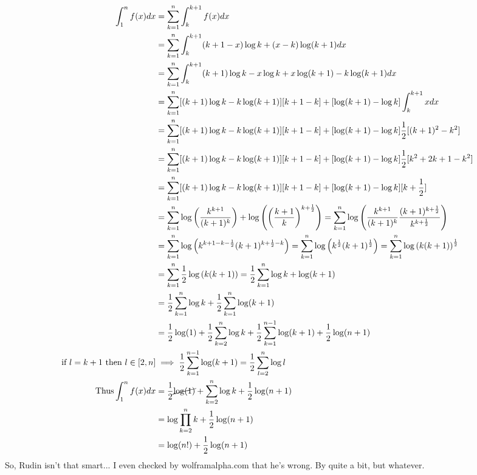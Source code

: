 \documentclass{article}
\begin{document}
\begin{align*}
  \int_{1}^n f(x) dx
  &=\sum_{k=1}^n \int_{k}^{k+1} f(x) dx\\
  &=\sum_{k=1}^n \int_{k}^{k+1} (k+1-x)\log k +(x-k)\log (k+1) dx\\
  &=\sum_{k=1}^n \int_{k}^{k+1} (k+1)\log k -x\log k +x\log
    (k+1)-k\log (k+1) dx\\
  &=\sum_{k=1}^n [(k+1)\log k -k\log (k+1)][k+1-k]  +[\log
    (k+1)-\log k]\int_{k}^{k+1} x dx\\
  &=\sum_{k=1}^n [(k+1)\log k -k\log (k+1)][k+1-k]  +[\log
    (k+1)-\log k]\frac{1}{2}[(k+1)^2 - k^2]\\
  &=\sum_{k=1}^n [(k+1)\log k -k\log (k+1)][k+1-k]  +[\log
    (k+1)-\log k]\frac{1}{2}[k^2+2k + 1 - k^2]\\
  &=\sum_{k=1}^n [(k+1)\log k -k\log (k+1)][k+1-k]  +[\log
    (k+1)-\log k][k + \frac{1}{2}]\\
  &=\sum_{k=1}^n \log \left(\frac{k^{k+1}}{(k+1)^k}\right) + \log\left(  \left(
    \frac{k+1}{k}\right)^{k + \frac{1}{2}}\right) =\sum_{k=1}^n \log \left(\frac{k^{k+1}}{(k+1)^k}
    \frac{(k+1)^{k + \frac{1}{2}}}{k^{k + \frac{1}{2}}}\right)\\
  &= \sum_{k=1}^n \log \left(  k^{k+1-k-\frac{1}{2}}(k+1)^{k +
    \frac{1}{2}-k}\right)
    = \sum_{k=1}^n \log \left(
    k^{\frac{1}{2}}(k+1)^{\frac{1}{2}}\right) = \sum_{k=1}^n \log \left(
    k(k+1)\right)^{\frac{1}{2}}\\
  &= \sum_{k=1}^n \frac{1}{2} \log \left(  k(k+1)\right) =
    \frac{1}{2}\sum_{k=1}^n  \log k + \log (k+1)\\
  &= \frac{1}{2}\sum_{k=1}^n  \log k + \frac{1}{2}\sum_{k=1}^n \log
    (k+1)\\
    &= \frac{1}{2}\log(1) + \frac{1}{2}\sum_{k=2}^n  \log k + \frac{1}{2}\sum_{k=1}^{n-1} \log
    (k+1) + \frac{1}{2}\log (n+1)\\
  \text{ if } l = k+1 \text{ then } l \in [2,n] &\implies \frac{1}{2}\sum_{k=1}^{n-1} \log
                        (k+1) = \frac{1}{2}\sum_{l=2}^n \log l\\
\text{Thus} \int_{1}^n f(x) dx
  &= \frac{1}{2}\cancel{ \log(1)}+ \sum_{k=2}^n  \log k  +
    \frac{1}{2}\log (n+1)\\
  &= \log \prod_{k=2}^n k  + \frac{1}{2}\log (n+1)\\
  &= \log(n!)  + \frac{1}{2}\log (n+1)
\end{align*}
So, Rudin isn't that smart... I even checked by wolframalpha.com that
he's wrong. By quite a bit, but whatever.
\end{document}
